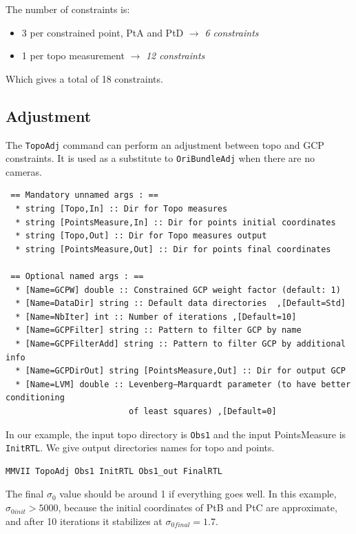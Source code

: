 The number of constraints is:
\begin{itemize}
   \item 3 per constrained point, PtA and PtD  $\rightarrow$ \textit{6 constraints}
   \item 1 per topo measurement $\rightarrow$ \textit{12 constraints}
\end{itemize}

Which gives a total of 18 constraints.


\subsection{Adjustment}
\label{subsec:TopoAdj}
The \texttt{TopoAdj} command can perform an adjustment between topo and GCP constraints.
It is used as a substitute to \texttt{OriBundleAdj} when there are no cameras.

\begin{verbatim}
 == Mandatory unnamed args : ==
  * string [Topo,In] :: Dir for Topo measures
  * string [PointsMeasure,In] :: Dir for points initial coordinates
  * string [Topo,Out] :: Dir for Topo measures output
  * string [PointsMeasure,Out] :: Dir for points final coordinates

 == Optional named args : ==
  * [Name=GCPW] double :: Constrained GCP weight factor (default: 1)
  * [Name=DataDir] string :: Default data directories  ,[Default=Std]
  * [Name=NbIter] int :: Number of iterations ,[Default=10]
  * [Name=GCPFilter] string :: Pattern to filter GCP by name
  * [Name=GCPFilterAdd] string :: Pattern to filter GCP by additional info
  * [Name=GCPDirOut] string [PointsMeasure,Out] :: Dir for output GCP
  * [Name=LVM] double :: Levenberg–Marquardt parameter (to have better conditioning
                         of least squares) ,[Default=0]
\end{verbatim}

In our example, the input topo directory is \texttt{Obs1} and the input PointsMeasure is \texttt{InitRTL}.
We give output directories names for topo and points.
\begin{lstlisting}
MMVII TopoAdj Obs1 InitRTL Obs1_out FinalRTL
\end{lstlisting}

The final $\sigma_0$ value should be around 1 if everything goes well.
In this example, $\sigma_{0 init} > 5000$, because the initial coordinates of PtB and PtC are approximate,
and after 10 iterations it stabilizes at $\sigma_{0 final} = 1.7$.
\\

